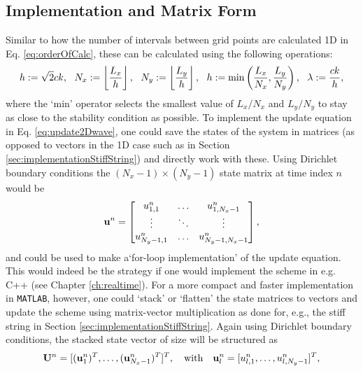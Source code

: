 \subsection{Implementation and Matrix Form}\label{sec:2DwaveImplementation}
Similar to how the number of intervals between grid points are calculated 1D in Eq. \eqref{eq:orderOfCalc}, these can be calculated using the following operations:
\begin{equation}\label{eq:orderOfCalc2D}
    h := \sqrt{2} ck, \ \ N_x := \floor[\frac{L_x}{h}], \ \  N_y := \floor[\frac{L_y}{h}], \ \  h := \text{min}\left(\frac{L_x}{N_x}, \frac{L_y}{N_y}\right), \ \  \lambda := \frac{ck}{h},
\end{equation}
where the `$\text{min}$' operator selects the smallest value of $L_x/N_x$ and $L_y/N_y$ to stay as close to the stability condition as possible. 
To implement the update equation in Eq. \eqref{eq:update2Dwave}, one could save the states of the system in matrices (as opposed to vectors in the 1D case such as in Section \ref{sec:implementationStiffString}) and directly work with these. Using Dirichlet boundary conditions the $(N_x-1) \times (N_y-1)$ state matrix at time index $n$ would be 
\begin{equation}
    \mathbf{u}^n = \begin{bmatrix}
        u^n_{1, 1} & \hdots & u^n_{1, N_x-1}\\
        \vdots & \ddots & \vdots\\
        u^n_{N_y-1, 1} & \hdots & u^n_{N_y-1, N_x-1}
    \end{bmatrix},
\end{equation}
and could  be used to make a`for-loop implementation' of the update equation. This would indeed be the strategy if one would implement the scheme in e.g. C++ (see Chapter \ref{ch:realtime}). For a more compact and faster implementation in \texttt{MATLAB}, however, one could `stack' or `flatten' the state matrices to vectors and update the scheme using matrix-vector multiplication as done for, e.g., the stiff string in Section \ref{sec:implementationStiffString}. Again using Dirichlet boundary conditions, the stacked state vector of size will be structured as
\begin{equation}\label{eq:stackedState}
    \mathbf{U}^n = [(\mathbf{u}_{1}^n)^T, \hdots, (\mathbf{u}_{N_x-1}^n)^T]^T, \quad \text{with} \quad \mathbf{u}^n_l = [u^n_{l, 1}, \hdots, u^n_{l, N_y-1}]^T,
\end{equation}
